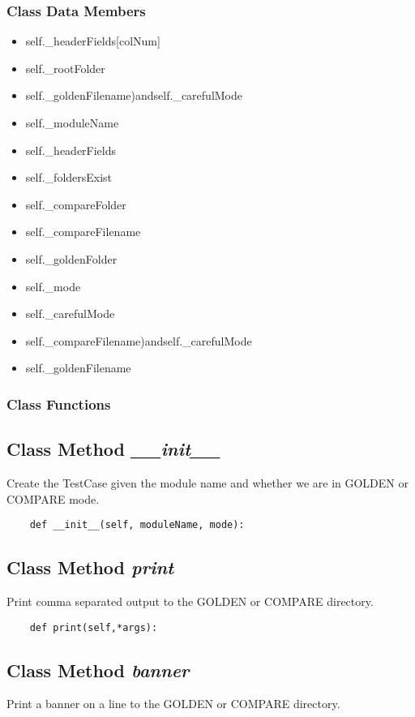 \documentclass[twoside,11pt]{book}
\begin{document}
\subsubsection{Class Data Members}
\begin{itemize}
\item{self.\_headerFields[colNum]}
\item{self.\_rootFolder}
\item{self.\_goldenFilename)andself.\_carefulMode}
\item{self.\_moduleName}
\item{self.\_headerFields}
\item{self.\_foldersExist}
\item{self.\_compareFolder}
\item{self.\_compareFilename}
\item{self.\_goldenFolder}
\item{self.\_mode}
\item{self.\_carefulMode}
\item{self.\_compareFilename)andself.\_carefulMode}
\item{self.\_goldenFilename}
\end{itemize}

\subsubsection{Class Functions}

\subsection{Class Method {\it \_\_init\_\_}}
Create the TestCase given the module name and whether we are in GOLDEN or COMPARE mode. 

\begin{lstlisting}
    def __init__(self, moduleName, mode):
\end{lstlisting}

\subsection{Class Method {\it print}}
Print comma separated output to the GOLDEN or COMPARE directory. 

\begin{lstlisting}
    def print(self,*args):
\end{lstlisting}

\subsection{Class Method {\it banner}}
Print a banner on a line to the GOLDEN or COMPARE directory. 
\end{document}
